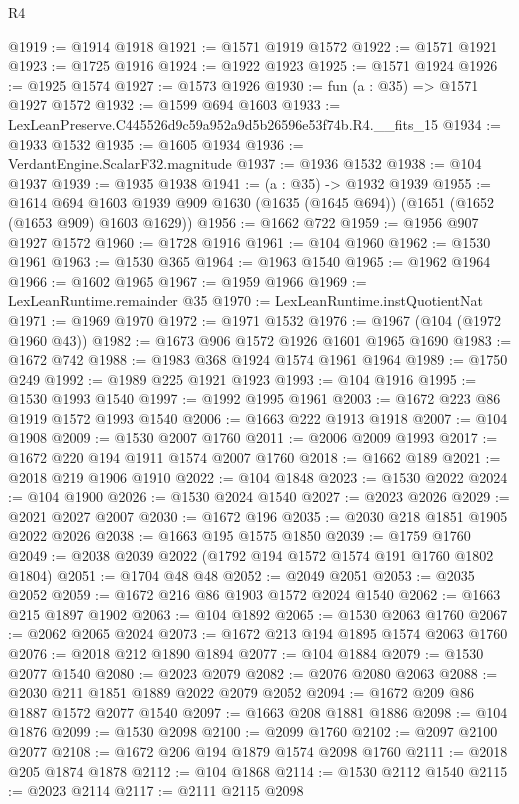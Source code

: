 \begin{lexlean}{R4}
\begin{coremodule}
@1919 := @1914 @1918
@1921 := @1571 @1919 @1572
@1922 := @1571 @1921
@1923 := @1725 @1916
@1924 := @1922 @1923
@1925 := @1571 @1924
@1926 := @1925 @1574
@1927 := @1573 @1926
@1930 := fun (a : @35) => @1571 @1927 @1572
@1932 := @1599 @694 @1603
@1933 := LexLeanPreserve.C445526d9c59a952a9d5b26596e53f74b.R4.__fits_15
@1934 := @1933 @1532
@1935 := @1605 @1934
@1936 := VerdantEngine.ScalarF32.magnitude
@1937 := @1936 @1532
@1938 := @104 @1937
@1939 := @1935 @1938
@1941 := (a : @35) -> @1932 @1939
@1955 := @1614
    @694
    @1603
    @1939
    @909
    @1630
    (@1635 (@1645 @694))
    (@1651 (@1652 (@1653 @909) @1603 @1629))
@1956 := @1662 @722
@1959 := @1956 @907 @1927 @1572
@1960 := @1728 @1916
@1961 := @104 @1960
@1962 := @1530 @1961
@1963 := @1530 @365
@1964 := @1963 @1540
@1965 := @1962 @1964
@1966 := @1602 @1965
@1967 := @1959 @1966
@1969 := LexLeanRuntime.remainder @35
@1970 := LexLeanRuntime.instQuotientNat
@1971 := @1969 @1970
@1972 := @1971 @1532
@1976 := @1967 (@104 (@1972 @1960 @43))
@1982 := @1673 @906 @1572 @1926 @1601 @1965 @1690
@1983 := @1672 @742
@1988 := @1983 @368 @1924 @1574 @1961 @1964
@1989 := @1750 @249
@1992 := @1989 @225 @1921 @1923
@1993 := @104 @1916
@1995 := @1530 @1993 @1540
@1997 := @1992 @1995 @1961
@2003 := @1672 @223 @86 @1919 @1572 @1993 @1540
@2006 := @1663 @222 @1913 @1918
@2007 := @104 @1908
@2009 := @1530 @2007 @1760
@2011 := @2006 @2009 @1993
@2017 := @1672 @220 @194 @1911 @1574 @2007 @1760
@2018 := @1662 @189
@2021 := @2018 @219 @1906 @1910
@2022 := @104 @1848
@2023 := @1530 @2022
@2024 := @104 @1900
@2026 := @1530 @2024 @1540
@2027 := @2023 @2026
@2029 := @2021 @2027 @2007
@2030 := @1672 @196
@2035 := @2030 @218 @1851 @1905 @2022 @2026
@2038 := @1663 @195 @1575 @1850
@2039 := @1759 @1760
@2049 := @2038 @2039 @2022 (@1792 @194 @1572 @1574 @191 @1760 @1802 @1804)
@2051 := @1704 @48 @48
@2052 := @2049 @2051
@2053 := @2035 @2052
@2059 := @1672 @216 @86 @1903 @1572 @2024 @1540
@2062 := @1663 @215 @1897 @1902
@2063 := @104 @1892
@2065 := @1530 @2063 @1760
@2067 := @2062 @2065 @2024
@2073 := @1672 @213 @194 @1895 @1574 @2063 @1760
@2076 := @2018 @212 @1890 @1894
@2077 := @104 @1884
@2079 := @1530 @2077 @1540
@2080 := @2023 @2079
@2082 := @2076 @2080 @2063
@2088 := @2030 @211 @1851 @1889 @2022 @2079 @2052
@2094 := @1672 @209 @86 @1887 @1572 @2077 @1540
@2097 := @1663 @208 @1881 @1886
@2098 := @104 @1876
@2099 := @1530 @2098
@2100 := @2099 @1760
@2102 := @2097 @2100 @2077
@2108 := @1672 @206 @194 @1879 @1574 @2098 @1760
@2111 := @2018 @205 @1874 @1878
@2112 := @104 @1868
@2114 := @1530 @2112 @1540
@2115 := @2023 @2114
@2117 := @2111 @2115 @2098

\end{coremodule}
\end{lexlean}
